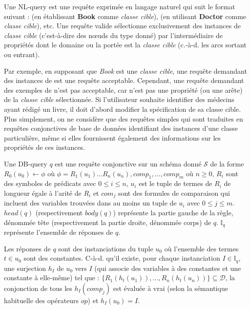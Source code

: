 \begin{definition}[NL-query]
    Une NL-query est une requête exprimée en langage naturel qui suit le format suivant :  (en établissant \textbf{Book} comme \emph{classe cible}),  (en utilisant \textbf{Doctor} comme \emph{classe cible}), etc.
    Une requête valide sélectionne exclusivement des instances de  \emph{classe cible} (c'est-à-dire des nœuds du type donné) par l'intermédiaire de propriétés dont le domaine ou la portée est la \emph{classe cible} (c.-à-d. les arcs sortant ou entrant).
\end{definition}

Par exemple, en supposant que \emph{Book} est une \emph{classe cible}, une requête demandant des instances de  est une requête acceptable.
Cependant, une requête demandant des exemples de  n'est pas acceptable, car  n'est pas une propriété (ou une arête) de la \emph{classe cible} sélectionnée.
Si l'utilisateur souhaite identifier des médecins ayant rédigé un livre, il doit d'abord modifier la spécification de sa classe cible.
Plus simplement, on ne considère que des requêtes simples qui sont traduites en requêtes conjonctives de base de données identifiant des instances d'une classe particulière, même si elles fournissent également des informations sur les propriétés de ces instances.

\begin{definition}[DB-query]
    Une DB-query $q$ est une requête conjonctive sur un schéma donné $\mathcal{S}$ de la forme $R_0(u_0) \leftarrow \phi$ où $\phi = R_1(u_1) \dots  R_n(u_n), comp_1, \dots, comp_m$ où $n \geq 0$, $R_i$ sont des symboles de prédicats avec $0 \leq i \leq n$, $u_i$ est le tuple de termes de $R_i$ de longueur égale à l'arité de $R_i$ et $com_j$ sont des formules de comparaison qui incluent des variables trouvées dans au moins un tuple de $u_i$ avec $0 \leq j \leq m$.
    $head(q)$ (respectivement $body(q)$) représente la partie gauche de la règle, dénommée tête (respectivement la partie droite, dénommée corps) de $q$.
    $\mathbb{I}_q$ représente l'ensemble de réponses de $q$.

    Les réponses de $q$ sont des instanciations du tuple $u_0$ où l'ensemble des termes $t \in u_0$ sont des constantes.
    C-à-d. qu'il existe, pour chaque instanciation $I \in \mathbb{I}_q$, une surjection $h_I$ de $u_0$ vers $I$ (qui associe des variables à des constantes et une constante à elle-même) tel que : $\{R_1(h_t(u_1)), \dots, R_n(h_t(u_n))\} \subseteq \mathcal{D}$, la conjonction de tous les $h_I(comp_j)$ est évaluée à vrai (selon la sémantique habituelle des opérateurs $op$) et $h_I(u_0)= I$.

\end{definition}


